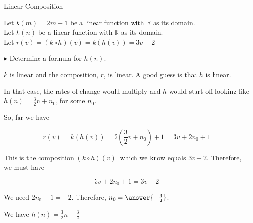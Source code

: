 \documentclass{ximera}
\begin{document}
\begin{example} Linear Composition 

Let $k(m) = 2 m + 1$ be a linear function with $\mathbb{R}$ as its domain. \\
Let $h(n)$ be a linear function with $\mathbb{R}$ as its domain. \\


Let $r(v) = (k \circ h)(v) = k(h(v)) = 3 v - 2$ 

$\blacktriangleright$ Determine a formula for $h(n)$.





\begin{explanation}


$k$ is linear and the composition, $r$, is linear. A good guess is that $h$ is linear.  

In that case, the rates-of-change would multiply and $h$ would start off looking like $h(n) = \frac{3}{2} n + n_0$, for some $n_0$.


So, far we have 

\[   r(v) = k(h(v)) = 2 \left(\frac{3}{2} v + n_0\right) + 1  = 3v + 2 n_0 + 1\]




This is the composition $(k \circ h)(v)$, which we know equals $3 v - 2$.  Therefore, we must have 

\[
3 v + 2 n_0 + 1  = 3 v - 2
\]



We need $2 n_0 + 1 = -2$.  Therefore, $n_0 = \answer{-\frac{3}{2}}$.


We have $h(n) = \frac{3}{2} n - \frac{3}{2}$


\end{explanation}
\end{example}
\end{document}
